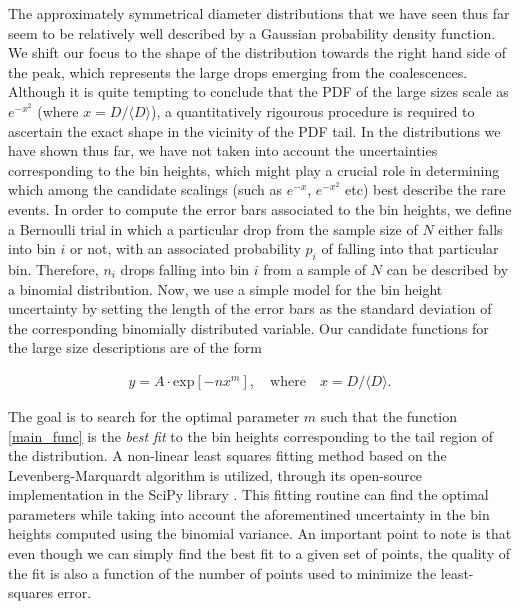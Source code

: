 The approximately symmetrical diameter distributions that we have seen 
thus far seem to be relatively well described by a Gaussian probability density function. 
We shift our focus to the shape of the distribution towards the right hand 
side of the peak, which represents the large drops emerging from the coalescences.
Although it is quite tempting to conclude that the PDF of the large sizes 
scale as $e^{-x^{2}}$ (where $x = D/\langle D \rangle$), a quantitatively rigourous
procedure is required to ascertain the exact shape in the vicinity of the PDF tail.
In the distributions we have shown thus far, we have not taken into account the 
uncertainties corresponding to the bin heights, which might play a crucial role in determining which among
the candidate scalings (such as $ e^{-x}$, $e^{-x^{2}}$ etc) best describe the rare events. 
In order to compute the error bars associated to the bin heights, we define 
a Bernoulli trial in which a particular drop from the sample size of $N$ either falls into
bin $i$ or not, with an associated probability $p_i$ of falling into that particular bin.
Therefore, $n_i$ drops falling into bin $i$ from a sample of $N$ can be described by a binomial distribution. 
Now, we use a simple model for the bin height uncertainty by setting the length 
of the error bars as the standard deviation 
of the corresponding binomially distributed variable. 
Our candidate functions for the large size descriptions are of the form 

\begin{align}
	y = A \cdot \textrm{exp}\left[-n x^m\right] , \quad \text{where} \quad x = D/\langle D \rangle . 
\label{main_func}
\end{align}

The goal is to search for the optimal parameter $m$ such that the function \eqref{main_func} 
is the \textit{best fit} to the bin heights corresponding to the tail region of the distribution.
A non-linear least squares fitting method based on the Levenberg-Marquardt algorithm 
is utilized, through its open-source implementation in the SciPy library \cite{scipy}. 
This fitting routine can find the optimal parameters while taking into account the 
aforementined uncertainty in the bin heights computed using the binomial variance. 
An important point to note is that even though we can simply find the best fit
to a given set of points, the quality of the fit is also a function
of the number of points used to minimize the least-squares error. 

